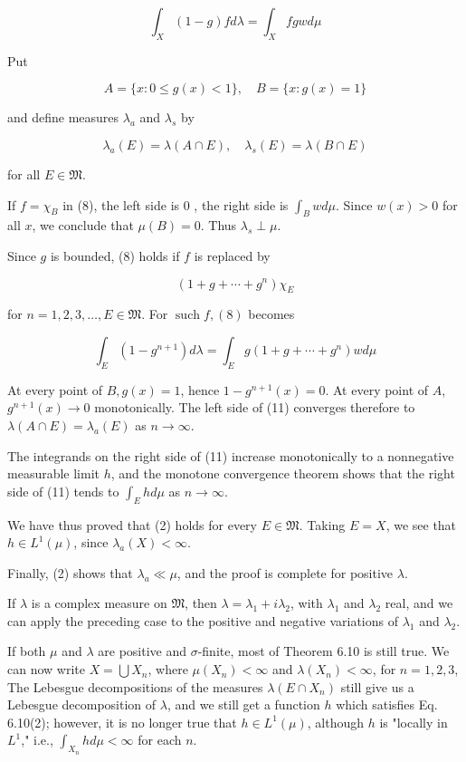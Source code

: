 \documentclass[10pt]{article}
\begin{document}
$$
\int_{X}(1-g) f d \lambda=\int_{X} f g w d \mu
$$

Put

$$
A=\{x: 0 \leq g(x)<1\}, \quad B=\{x: g(x)=1\}
$$

and define measures $\lambda_{a}$ and $\lambda_{s}$ by

$$
\lambda_{a}(E)=\lambda(A \cap E), \quad \lambda_{s}(E)=\lambda(B \cap E)
$$

for all $E \in \mathfrak{M}$.

If $f=\chi_{B}$ in (8), the left side is 0 , the right side is $\int_{B} w d \mu$. Since $w(x)>0$ for all $x$, we conclude that $\mu(B)=0$. Thus $\lambda_{s} \perp \mu$.

Since $g$ is bounded, (8) holds if $f$ is replaced by

$$
\left(1+g+\cdots+g^{n}\right) \chi_{E}
$$

for $n=1,2,3, \ldots, E \in \mathfrak{M}$. For $\operatorname{such} f,(8)$ becomes

$$
\int_{E}\left(1-g^{n+1}\right) d \lambda=\int_{E} g\left(1+g+\cdots+g^{n}\right) w d \mu
$$

At every point of $B, g(x)=1$, hence $1-g^{n+1}(x)=0$. At every point of $A$, $g^{n+1}(x) \rightarrow 0$ monotonically. The left side of (11) converges therefore to $\lambda(A \cap E)=\lambda_{a}(E)$ as $n \rightarrow \infty$.

The integrands on the right side of (11) increase monotonically to a nonnegative measurable limit $h$, and the monotone convergence theorem shows that the right side of (11) tends to $\int_{E} h d \mu$ as $n \rightarrow \infty$.

We have thus proved that (2) holds for every $E \in \mathfrak{M}$. Taking $E=X$, we see that $h \in L^{1}(\mu)$, since $\lambda_{a}(X)<\infty$.

Finally, (2) shows that $\lambda_{a} \ll \mu$, and the proof is complete for positive $\lambda$.

If $\lambda$ is a complex measure on $\mathfrak{M}$, then $\lambda=\lambda_{1}+i \lambda_{2}$, with $\lambda_{1}$ and $\lambda_{2}$ real, and we can apply the preceding case to the positive and negative variations of $\lambda_{1}$ and $\lambda_{2}$.

If both $\mu$ and $\lambda$ are positive and $\sigma$-finite, most of Theorem 6.10 is still true. We can now write $X=\bigcup X_{n}$, where $\mu\left(X_{n}\right)<\infty$ and $\lambda\left(X_{n}\right)<\infty$, for $n=1,2,3$, The Lebesgue decompositions of the measures $\lambda\left(E \cap X_{n}\right)$ still give us a Lebesgue decomposition of $\lambda$, and we still get a function $h$ which satisfies Eq. 6.10(2); however, it is no longer true that $h \in L^{1}(\mu)$, although $h$ is "locally in $L^{1}$," i.e., $\int_{X_{n}} h d \mu<\infty$ for each $n$.
\end{document}
